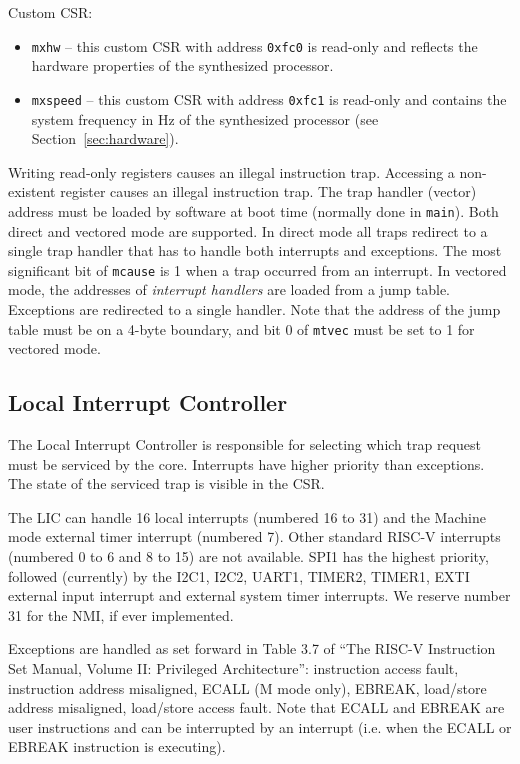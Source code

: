 \documentclass[12pt]{article}
\begin{document}
Custom CSR:

\begin{itemize}
\item \lstinline|mxhw| -- this custom CSR with address \lstinline|0xfc0| is read-only and reflects the hardware properties of the synthesized processor.
\item \lstinline|mxspeed| -- this custom CSR with address \lstinline|0xfc1| is read-only and contains the system frequency in Hz of the synthesized processor (see Section~\ref{sec:hardware}).
\end{itemize}

Writing read-only registers causes an illegal instruction trap. Accessing a non-existent register causes an illegal instruction trap. The trap handler (vector) address must be loaded by software at boot time (normally done in \lstinline|main|). Both direct and vectored mode are supported. In direct mode all traps redirect to a single trap handler that has to handle both interrupts and exceptions. The most significant bit of \lstinline|mcause| is 1 when a trap occurred from an interrupt. In vectored mode, the addresses of \emph{interrupt handlers} are loaded from a jump table. Exceptions are redirected to a single handler. Note that the address of the jump table must be on a 4-byte boundary, and bit 0 of \lstinline|mtvec| must be set to 1 for vectored mode.


\subsection{Local Interrupt Controller}
The Local Interrupt Controller is responsible for selecting which trap request must be serviced by the core. Interrupts have higher priority than exceptions. The state of the serviced trap is visible in the CSR.

The LIC can handle 16 local interrupts (numbered 16 to 31) and the Machine mode external timer interrupt (numbered 7). Other standard RISC-V interrupts (numbered 0 to 6 and 8 to 15) are not available. SPI1 has the highest priority, followed (currently) by the I2C1, I2C2, UART1, TIMER2, TIMER1, EXTI external input interrupt and external system timer interrupts. We reserve number 31 for the NMI, if ever implemented.

Exceptions are handled as set forward in Table 3.7 of ``The RISC-V Instruction Set Manual, Volume II: Privileged Architecture'': instruction access fault, instruction address misaligned, ECALL (M mode only), EBREAK, load/store address misaligned, load/store access fault. Note that ECALL and EBREAK are user instructions and can be interrupted by an interrupt (i.e. when the ECALL or EBREAK instruction is executing).
\end{document}
